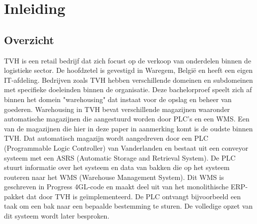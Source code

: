 

\newpage



\section{Inleiding}%
\label{sec:inleiding}

\subsection{Overzicht}

TVH is een retail bedrijf dat zich focust op de verkoop van onderdelen binnen de logistieke sector. 
De hoofdzetel is gevestigd in Waregem, België en heeft een eigen IT-afdeling.
Bedrijven zoals TVH hebben verschillende domeinen en subdomeinen met specifieke doeleinden binnen de organisatie. 
Deze bachelorproef speelt zich af binnen het domein "warehousing" dat instaat voor de opslag en beheer van goederen. 
Warehousing in TVH bevat verschillende magazijnen waaronder automatische magazijnen die aangestuurd worden door PLC's en een WMS.
Een van de magazijnen die hier in deze paper in aanmerking komt is de oudste binnen TVH. 
Dat automatisch magazijn wordt aangedreven door een PLC (Programmable Logic Controller) 
van Vanderlanden en bestaat uit een conveyor systeem met een ASRS (Automatic Storage and Retrieval System).
De PLC stuurt informatie over het systeem en data van bakken die op het systeem routeren naar het WMS (Warehouse Management System). 
Dit WMS is geschreven in Progress 4GL-code en maakt deel uit van het monolithische ERP-pakket dat door TVH is geïmplementeerd. 
De PLC ontvangt bijvoorbeeld een taak om een bak naar een bepaalde bestemming te sturen. 
De volledige opzet van dit systeem wordt later besproken.

